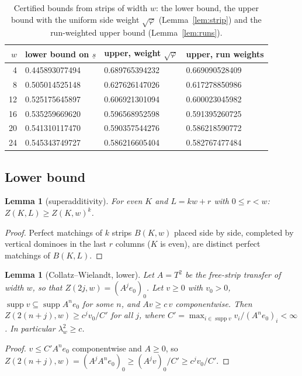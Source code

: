 \documentclass[11pt]{amsart}
\newtheorem{lemma}[theorem]{Lemma}
\theoremstyle{definition}
\theoremstyle{remark}
\newcommand{\supp}{\operatorname{supp}}
\begin{document}
\begin{table}[ht]
\caption{Certified bounds from strips of width $w$: the lower bound, the upper bound with the
uniform side weight $\sqrt\varphi$ (Lemma~\ref{lem:strip}) and the run-weighted upper bound
(Lemma~\ref{lem:runs}).}\label{tab:bounds}
\begin{tabular}{rlll}
\toprule
$w$ & lower bound on $\underline s$ & upper, weight $\sqrt\varphi$ & upper, run weights \\
\midrule
4  & 0.445893077494 & 0.689765394232 & 0.669090528409 \\
8  & 0.505014525148 & 0.627626147026 & 0.617278850986 \\
12 & 0.525175645897 & 0.606921301094 & 0.600023045982 \\
16 & 0.535259669620 & 0.596568952598 & 0.591395260725 \\
20 & 0.541310117470 & 0.590357544276 & 0.586218590772 \\
24 & 0.545343749727 & 0.586216605404 & 0.582767477484 \\
\bottomrule
\end{tabular}
\end{table}

\subsection{Lower bound}

\begin{lemma}[superadditivity]\label{lem:super}
For even $K$ and $L = kw + r$ with $0 \le r < w$: $Z(K, L) \ge Z(K, w)^k$.
\end{lemma}
\begin{proof}
Perfect matchings of $k$ strips $B(K, w)$ placed side by side, completed by vertical dominoes in
the last $r$ columns ($K$ is even), are distinct perfect matchings of $B(K, L)$.
\end{proof}

\begin{lemma}[Collatz--Wielandt, lower]\label{lem:cwlow}
Let $A = T^2$ be the free-strip transfer of width $w$, so that $Z(2j, w) = (A^j e_0)_0$. Let
$v \ge 0$ with $v_0 > 0$, $\supp v \subseteq \supp A^n e_0$ for some $n$, and $Av \ge c\,v$
componentwise. Then $Z(2(n + j), w) \ge c^j v_0 / C'$ for all $j$, where
$C' = \max_{i \in \supp v} v_i / (A^n e_0)_i < \infty$. In particular $\lambda_w^2 \ge c$.
\end{lemma}
\begin{proof}
$v \le C' A^n e_0$ componentwise and $A \ge 0$, so
$Z(2(n+j), w) = (A^j A^n e_0)_0 \ge (A^j v)_0 / C' \ge c^j v_0 / C'$.
\end{proof}
\end{document}
